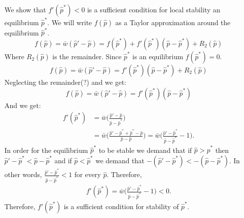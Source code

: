 \documentclass[12pt]{extarticle}
\begin{document}
\begin{appendices}
We show that $f'(\hat{p}^*)<0$ is a sufficient condition for local stability an equilibrium $\hat{p}^*$.
We will write $f(\hat{p})$ as a Taylor approximation around the equilibrium $\hat{p}^*$. 
\begin{equation} \label{eq:appendix_b_taylor}
  f(\hat{p}) = \bar{w}(\hat{p}'-\hat{p}) = f(\hat{p}^*) + f'(\hat{p}^*)(\hat{p}-\hat{p}^*) + R_2(\hat{p})
\end{equation}
Where $R_2(\hat{p})$ is the remainder. Since $\hat{p}^*$ is an equilibrium $f(\hat{p}^*)=0$.
\begin{equation} \label{eq:appendix_b_taylor0}
  f(\hat{p}) = \bar{w}(\hat{p}'-\hat{p}) =  f'(\hat{p}^*)(\hat{p}-\hat{p}^*) + R_2(\hat{p})
\end{equation}
Neglecting the remainder(?) and we get: 
\begin{equation} \label{eq:appendix_b_taylor_without_remainder}
  f(\hat{p}) = \bar{w}(\hat{p}'-\hat{p}) = f'(\hat{p}^*)(\hat{p}-\hat{p}^*)
\end{equation}
And we get:
\begin{equation} \label{eq:appendix_b_derivative}
  \begin{aligned}
  f'(\hat{p}^*) &= \bar{w}\Big(\frac{\hat{p}'-\hat{p}}{\hat{p}-\hat{p}^*}\Big)\\
  & = \bar{w}\Big(\frac{\hat{p}'-\hat{p}^*+\hat{p}^*-\hat{p}}{\hat{p}-\hat{p}}\Big) 
  = \bar{w}\Big(\frac{\hat{p}'-\hat{p}^*}{\hat{p}-\hat{p}^*}-1\Big) .
  \end{aligned}
\end{equation}
In order for the equilibrium $\hat{p}^*$ to be stable we demand that if $\hat{p} > \hat{p}^*$ then $\hat{p}'-\hat{p}^* < \hat{p}-\hat{p}^*$
and if $\hat{p} < \hat{p}^*$ we demand that $-(\hat{p}'-\hat{p}^*) < -(\hat{p}-\hat{p}^*)$. 
In other words, $\frac{\hat{p}'-\hat{p}^*}{\hat{p}-\hat{p}^*}<1$ for every $\hat{p}$.
Therefore,
\begin{equation} \label{eq:appendix_b_condition}
  \begin{aligned}
  f'(\hat{p}^*) = \bar{w}\Big(\frac{\hat{p}'-\hat{p}^*}{\hat{p}-\hat{p}^*}-1\Big) < 0 .
  \end{aligned}
\end{equation}
Therefore, $f'(\hat{p}^*)$ is a sufficient condition for stability of $\hat{p}^*$.

\end{appendices}
\end{document}
